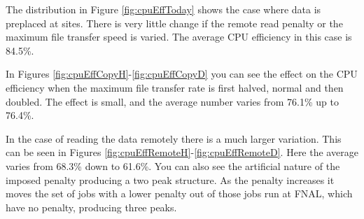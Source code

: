 \documentclass[a4paper]{jpconf}
\begin{document}
The distribution in Figure \ref{fig:cpuEffToday} shows the case where
data is preplaced at sites. There is very little change if the remote
read penalty or the maximum file transfer speed is varied. The average
CPU efficiency in this case is 84.5\%.

In Figures \ref{fig:cpuEffCopyH}-\ref{fig:cpuEffCopyD} you can see the
effect on the CPU efficiency when the maximum file transfer rate is
first halved, normal and then doubled. The effect is small, and the
average number varies from 76.1\% up to 76.4\%.

In the case of reading the data remotely there is a much larger
variation. This can be seen in Figures
\ref{fig:cpuEffRemoteH}-\ref{fig:cpuEffRemoteD}. Here the average
varies from 68.3\% down to 61.6\%. You can also see the artificial
nature of the imposed penalty producing a two peak structure. As the
penalty increases it moves the set of jobs with a lower penalty out of
those jobs run at FNAL, which have no penalty, producing three peaks.
\end{document}
